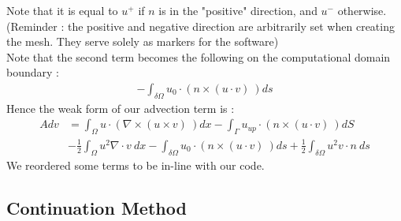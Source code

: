 \documentclass[11pt,twoside,a4paper]{article}
\begin{document}
Note that it is equal to $u^+$ if $n$ is in the "positive" direction, and $u^-$ otherwise. (Reminder : the positive and negative direction are arbitrarily set when creating the mesh. They serve solely as markers for the software)\\
Note that the second term becomes the following on the computational domain boundary :
\begin{align*}
- \int_{\delta \Omega} u_0 \cdot (n \times (u \cdot v) \ ) ds
\end{align*}
Hence the weak form of our advection term is : 
\begin{align}
 Adv &= \int_\Omega u \cdot (\nabla \times (u \times v) \ ) dx - \int_{\Gamma} u_{up} \cdot (n \times (u \cdot v) \ ) dS \\ 
&- \frac{1}{2} \int_\Omega u^2 \nabla \cdot v \ dx - \int_{\delta \Omega} u_0 \cdot (n \times (u \cdot v) \ ) ds
+ \frac{1}{2} \int_{\delta \Omega } u^2 v \cdot n \ ds 
\end{align}
We reordered some terms to be in-line with our code.

\subsection{Continuation Method}
\end{document}
